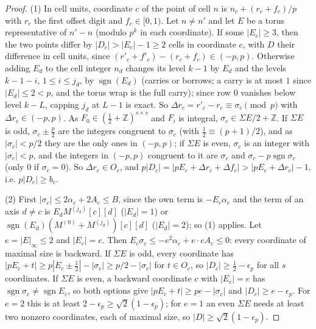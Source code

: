 \documentclass[11pt]{amsart}
\theoremstyle{definition}
\theoremstyle{plain}
\newcommand{\Z}{\mathbb{Z}}
\DeclareMathOperator{\sgn}{sgn}
\begin{document}
\begin{proof}
(1) In cell units, coordinate $c$ of the point of cell $n$ is $n_c+(r_c+f_c)/p$ with $r_c$ the first offset digit and $f_c\in[0,1)$. Let $n\ne n'$ and let $E$ be a torus representative of $n'-n$ (modulo $p^k$ in each coordinate). If some $|E_c|\ge3$, then the two points differ by $|D_c|>|E_c|-1\ge2$ cells in coordinate $c$, with $D$ their difference in cell units, since $(r'_c+f'_c)-(r_c+f_c)\in(-p,p)$. Otherwise adding $E_d$ to the cell integer $n_d$ changes its level $k-1$ by $E_d$ and the levels $k-1-i$, $1\le i\le j_d$, by $\sgn(E_d)$ (carries or borrows; a carry is at most $1$ since $|E_d|\le2<p$, and the torus wrap is the full carry); since row $0$ vanishes below level $k-L$, capping $j_d$ at $L-1$ is exact. So $\Delta r_c=r'_c-r_c\equiv\sigma_c\pmod p$ with $\Delta r_c\in(-p,p)$. As $F_0\in(\frac12+\Z)^{s\times s}$ and $F_i$ is integral, $\sigma_c\in\Sigma E/2+\Z$. If $\Sigma E$ is odd, $\sigma_c\pm\frac p2$ are the integers congruent to $\sigma_c$ (with $\frac12\equiv(p+1)/2$), and as $|\sigma_c|<p/2$ they are the only ones in $(-p,p)$; if $\Sigma E$ is even, $\sigma_c$ is an integer with $|\sigma_c|<p$, and the integers in $(-p,p)$ congruent to it are $\sigma_c$ and $\sigma_c-p\sgn\sigma_c$ (only $0$ if $\sigma_c=0$). So $\Delta r_c\in O_c$, and $p|D_c|=|pE_c+\Delta r_c+\Delta f_c|>|pE_c+\Delta r_c|-1$, i.e. $p|D_c|\ge b_c$.

(2) First $|\sigma_c|\le2\alpha_c+2A_c\le B$, since the own term is $-E_c\alpha_c$ and the term of an axis $d\ne c$ is $E_dM^{(j_d)}[c][d]$ ($|E_d|=1$) or $\sgn(E_d)(M^{(0)}+M^{(j_d)})[c][d]$ ($|E_d|=2$); so (1) applies. Let $e=|E|_\infty\le2$ and $|E_c|=e$. Then $E_c\sigma_c\le-e^2\alpha_c+e\cdot eA_c\le0$: every coordinate of maximal size is backward. If $\Sigma E$ is odd, every coordinate has $|pE_c+t|\ge p|E_c\pm\frac12|-|\sigma_c|\ge p/2-|\sigma_c|$ for $t\in O_c$, so $|D_c|\ge\frac12-\epsilon_p$ for all $s$ coordinates. If $\Sigma E$ is even, a backward coordinate $c$ with $|E_c|=e$ has $\sgn\sigma_c\ne\sgn E_c$, so both options give $|pE_c+t|\ge pe-|\sigma_c|$ and $|D_c|\ge e-\epsilon_p$. For $e=2$ this is at least $2-\epsilon_p\ge\sqrt2(1-\epsilon_p)$; for $e=1$ an even $\Sigma E$ needs at least two nonzero coordinates, each of maximal size, so $|D|\ge\sqrt2(1-\epsilon_p)$.


\end{proof}
\end{document}
